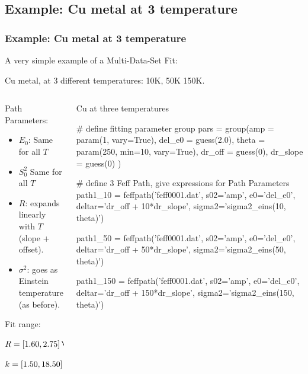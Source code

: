 \subsection{Example: Cu metal at 3 temperature}
\begin{frame}[fragile] \frametitle{Example: Cu metal at 3 temperature}

\begin{cenpage}{130mm}
    A very simple example of a Multi-Data-Set Fit:

    Cu metal, at 3 different  temperatures: 10K, 50K 150K.

   \begin{columns}
     \begin{column}{55mm}
        \vmm  Path Parameters:
       \begin{itemize}
       \item $E_0$:  Same for all $T$
       \item $S_0^2$  Same for all $T$
       \item $R$:  expands linearly with $T$ (slope + offset).
       \item $\sigma^2$:  goes as Einstein temperature (as before).
       \end{itemize}

       {}

       \vmm Fit range: \vmm

       \hspace{2mm} $R = [1.60, 2.75] \rm\, \AA$

       \vmm
       \hspace{2mm}  $k = [1.50, 18.50] \rm\, \AA^{-1}$
     \end{column}
     \begin{column}{65mm}

  \begin{CodeBlock}{60mm}{Cu at three temperatures}

# define fitting parameter group
pars = group(amp      = param(1, vary=True),
             del_e0   = guess(2.0),
             theta    = param(250, min=10, vary=True),
             dr_off   = guess(0),
             dr_slope = guess(0) )

# define 3 Feff Path, give expressions for Path Parameters
path1_10  = feffpath('feff0001.dat',
                     s02='amp', e0='del_e0',
                     deltar='dr_off + 10*dr_slope',
                     sigma2='sigma2_eins(10, theta)')

path1_50  = feffpath('feff0001.dat',
                     s02='amp', e0='del_e0',
                     deltar='dr_off + 50*dr_slope',
                     sigma2='sigma2_eins(50, theta)')

path1_150 = feffpath('feff0001.dat',
                     s02='amp', e0='del_e0',
                     deltar='dr_off + 150*dr_slope',
                     sigma2='sigma2_eins(150, theta)')

   \end{CodeBlock}
 \end{column}
\end{columns}
\end{cenpage}
\end{frame}


